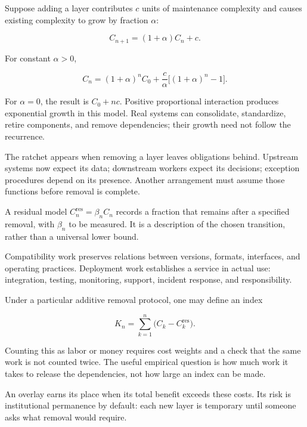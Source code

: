 Suppose adding a layer contributes $c$ units of maintenance complexity and causes existing complexity to grow by fraction $\alpha$:

\begin{equation}
C_{n+1}=(1+\alpha)C_n+c.
\label{eq:ratchet-recursion}
\end{equation}

For constant $\alpha>0$,

\begin{equation}
C_n=(1+\alpha)^nC_0+
\frac{c}{\alpha}\big[(1+\alpha)^n-1\big].
\label{eq:ratchet-floor}
\end{equation}

For $\alpha=0$, the result is $C_0+nc$. Positive proportional interaction produces exponential growth in this model. Real systems can consolidate, standardize, retire components, and remove dependencies; their growth need not follow the recurrence.

The ratchet appears when removing a layer leaves obligations behind. Upstream systems now expect its data; downstream workers expect its decisions; exception procedures depend on its presence. Another arrangement must assume those functions before removal is complete.

A residual model $C_n^{\mathrm{res}}=\beta_n C_n$ records a fraction that remains after a specified removal, with $\beta_n$ to be measured. It is a description of the chosen transition, rather than a universal lower bound.


Compatibility work preserves relations between versions, formats, interfaces, and operating practices. Deployment work establishes a service in actual use: integration, testing, monitoring, support, incident response, and responsibility.

Under a particular additive removal protocol, one may define an index

\begin{equation}
K_n=\sum_{k=1}^n\big(C_k-C_k^{\mathrm{res}}\big).
\label{eq:compat-tax}
\end{equation}

Counting this as labor or money requires cost weights and a check that the same work is not counted twice. The useful empirical question is how much work it takes to release the dependencies, not how large an index can be made.

An overlay earns its place when its total benefit exceeds these costs. Its risk is institutional permanence by default: each new layer is temporary until someone asks what removal would require.

